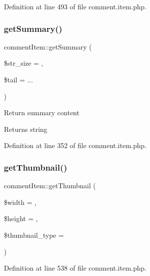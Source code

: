 Definition at line 493 of file comment.\+item.\+php.

\hypertarget{classcommentItem_a3705efbd1d15d8defc8e4ec371daf01b}{}\label{classcommentItem_a3705efbd1d15d8defc8e4ec371daf01b} 
\subsubsection{\texorpdfstring{get\+Summary()}{getSummary()}}
{\footnotesize\ttfamily comment\+Item\+::get\+Summary (\begin{DoxyParamCaption}\item[{}]{\$str\+\_\+size = {},  }\item[{}]{\$tail = {\ttfamily \textquotesingle{}...\textquotesingle{}} }\end{DoxyParamCaption})}

Return summary content \begin{DoxyReturn}{Returns}
string 
\end{DoxyReturn}


Definition at line 352 of file comment.\+item.\+php.

\hypertarget{classcommentItem_a4a4175f24e633332e57bdada6f75ffdf}{}\label{classcommentItem_a4a4175f24e633332e57bdada6f75ffdf} 
\subsubsection{\texorpdfstring{get\+Thumbnail()}{getThumbnail()}}
{\footnotesize\ttfamily comment\+Item\+::get\+Thumbnail (\begin{DoxyParamCaption}\item[{}]{\$width = {},  }\item[{}]{\$height = {},  }\item[{}]{\$thumbnail\+\_\+type = {\ttfamily \textquotesingle{}\textquotesingle{}} }\end{DoxyParamCaption})}



Definition at line 538 of file comment.\+item.\+php.

\hypertarget{classcommentItem_a688fe6f0328ed3f28f72104943d5c335}{}\label{classcommentItem_a688fe6f0328ed3f28f72104943d5c335} 

